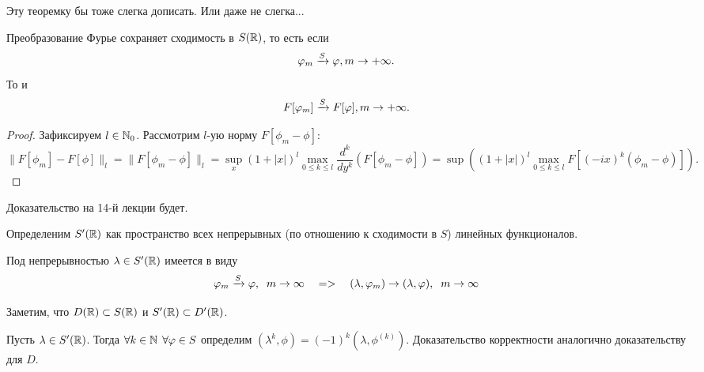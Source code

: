 \begin{note}
    Эту теоремку бы тоже слегка дописать.
    Или даже не слегка...
\end{note}
\begin{theorem}
    Преобразование Фурье сохраняет сходимость в $S(\mathbb{R})$, то есть если
    \[
        \varphi_m \xrightarrow{S} \varphi, m \rightarrow +\infty.
    \]
    То и
    \[
        F[\varphi_m] \xrightarrow{S} F[\varphi], m \rightarrow +\infty.
    \]
\end{theorem}
\begin{proof}
    Зафиксируем $l \in \mathbb{N}_0$.
    Рассмотрим $l$-ую норму $F[\phi_m - \phi]$:
    \[
        \|F[\phi_m] - F[\phi]\|_{l} = \|F[\phi_m - \phi]\|_{l} = \sup \limits_x (1 + |x|)^l \max\limits_{0 \leq k \leq l} \dfrac{d^k}{dy^k}(F[\phi_m - \phi]) = \sup ((1 + |x|)^l \max\limits_{0 \leq k \leq l} F[(-ix)^k(\phi_m - \phi)]).
    \]
\end{proof}
\begin{note}
    Доказательство на 14-й лекции будет.
\end{note}
\begin{definition}
    Определеним $S'(\mathbb{R})$ как пространство всех непрерывных (по отношению к сходимости в $S$) линейных функционалов.
\end{definition}
\begin{note}
    Под непрерывностью $\lambda \in S'(\mathbb{R})$ имеется в виду 
    \[ \varphi_m \xrightarrow{S} \varphi, \;\; m \rightarrow \infty \quad => \quad (\lambda, \varphi_m) \rightarrow (\lambda, \varphi), \;\; m \rightarrow \infty
    \]
\end{note}
\begin{note}
    Заметим, что $D(\mathbb{R}) \subset S(\mathbb{R})$ и $S'(\mathbb{R}) \subset D'(\mathbb{R})$.
\end{note}
\begin{definition}
    Пусть $\lambda \in S'(\mathbb{R})$.
    Тогда $\forall k \in \mathbb{N} \;\, \forall \varphi \in S$ определим $(\lambda^k, \phi) = (-1)^k (\lambda, \phi^{(k)})$.
    Доказательство корректности аналогично доказательству для $D$.
\end{definition}
